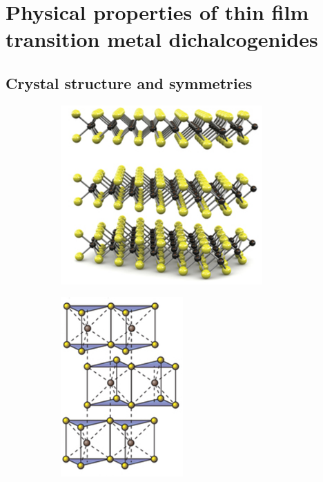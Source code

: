\chapter{Physical properties of thin film transition metal dichalcogenides}

\section{Crystal structure and symmetries}

\begin{figure}[t]
	\centering
	\begin{subfigure}{0.30\textwidth}
		\caption{}
		\includegraphics[height=.9\textwidth,left]{3d}
		\label{crystal1}
	\end{subfigure}
	\begin{subfigure}{0.30\textwidth}
		\caption{}
		\includegraphics[height=.9\textwidth,center]{triangles}

\end{subfigure}
\end{figure}
